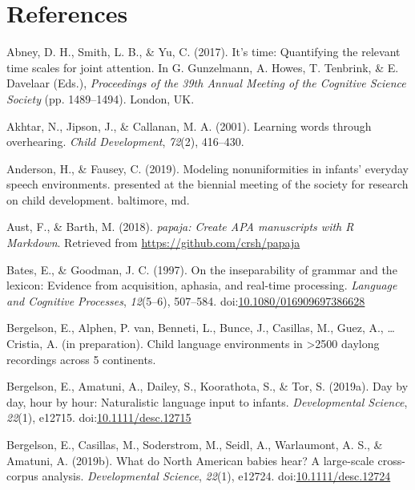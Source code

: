 \documentclass[,man,floatsintext]{apa6}
\begin{document}
\newpage

\section{References}\label{refs}

\begingroup
\setlength{\parindent}{-0.5in} \setlength{\leftskip}{0.5in}

\hypertarget{refs}{}
\hypertarget{ref-abney2017time}{}
Abney, D. H., Smith, L. B., \& Yu, C. (2017). It's time: Quantifying the
relevant time scales for joint attention. In G. Gunzelmann, A. Howes, T.
Tenbrink, \& E. Davelaar (Eds.), \emph{Proceedings of the 39th Annual
Meeting of the Cognitive Science Society} (pp. 1489--1494). London, UK.

\hypertarget{ref-akhtar2001learning}{}
Akhtar, N., Jipson, J., \& Callanan, M. A. (2001). Learning words
through overhearing. \emph{Child Development}, \emph{72}(2), 416--430.

\hypertarget{ref-anderson2019modeling}{}
Anderson, H., \& Fausey, C. (2019). Modeling nonuniformities in infants'
everyday speech environments. presented at the biennial meeting of the
society for research on child development. baltimore, md.

\hypertarget{ref-R-papaja}{}
Aust, F., \& Barth, M. (2018). \emph{papaja: Create APA manuscripts with
R Markdown}. Retrieved from \url{https://github.com/crsh/papaja}

\hypertarget{ref-bates1997inseparability}{}
Bates, E., \& Goodman, J. C. (1997). On the inseparability of grammar
and the lexicon: Evidence from acquisition, aphasia, and real-time
processing. \emph{Language and Cognitive Processes}, \emph{12}(5--6),
507--584.
doi:\href{https://doi.org/10.1080/016909697386628}{10.1080/016909697386628}

\hypertarget{ref-bergelsonIPbsl}{}
Bergelson, E., Alphen, P. van, Benneti, L., Bunce, J., Casillas, M.,
Guez, A., \ldots{} Cristia, A. (in preparation). Child language
environments in \textgreater{}2500 daylong recordings across 5
continents.

\hypertarget{ref-bergelson2019day}{}
Bergelson, E., Amatuni, A., Dailey, S., Koorathota, S., \& Tor, S.
(2019a). Day by day, hour by hour: Naturalistic language input to
infants. \emph{Developmental Science}, \emph{22}(1), e12715.
doi:\href{https://doi.org/10.1111/desc.12715}{10.1111/desc.12715}

\hypertarget{ref-bergelsoncasillas2019what}{}
Bergelson, E., Casillas, M., Soderstrom, M., Seidl, A., Warlaumont, A.
S., \& Amatuni, A. (2019b). What do North American babies hear? A
large-scale cross-corpus analysis. \emph{Developmental Science},
\emph{22}(1), e12724.
doi:\href{https://doi.org/10.1111/desc.12724}{10.1111/desc.12724}
\end{document}
